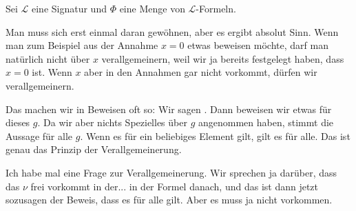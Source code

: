 \begin{math-stroke}
Sei $\mathcal{L}$ eine Signatur und $\Phi$ eine Menge von $\mathcal{L}$-Formeln.

\end{math-stroke}

\begin{spoken-clean}[00:25:54 - 00:26:45]
Man muss sich erst einmal daran gewöhnen, aber es ergibt absolut Sinn. Wenn man zum Beispiel aus der Annahme $x = 0$ etwas beweisen möchte, darf man natürlich nicht über $x$ verallgemeinern, weil wir ja bereits festgelegt haben, dass $x = 0$ ist. Wenn $x$ aber in den Annahmen gar nicht vorkommt, dürfen wir verallgemeinern.

Das machen wir in Beweisen oft so: Wir sagen . Dann beweisen wir etwas für dieses $g$. Da wir aber nichts Spezielles über $g$ angenommen haben, stimmt die Aussage für alle $g$. Wenn es für ein beliebiges Element gilt, gilt es für alle. Das ist genau das Prinzip der Verallgemeinerung.
\end{spoken-clean}

\begin{student-interaction}
Ich habe mal eine Frage zur Verallgemeinerung. Wir sprechen ja darüber, dass das $\nu$ frei vorkommt in der... in der Formel danach, und das ist dann jetzt sozusagen der Beweis, dass es für alle gilt. Aber es muss ja nicht vorkommen.
\end{student-interaction}

